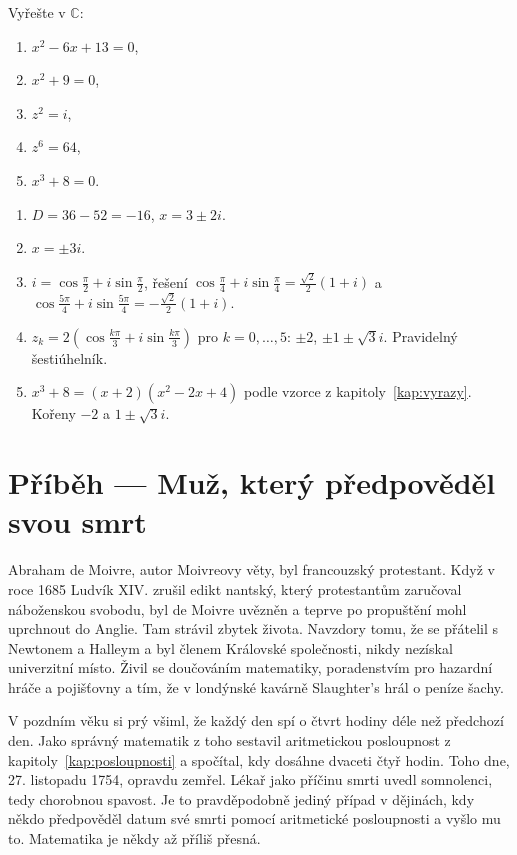 \begin{problem}
  Vyřešte v $\mathbb{C}$:
  \begin{enumerate}[label=(\alph*)]
    \item $x^2 - 6x + 13 = 0$,
    \item $x^2 + 9 = 0$,
    \item $z^2 = i$,
    \item $z^6 = 64$,
    \item $x^3 + 8 = 0$.
  \end{enumerate}
\end{problem}

\begin{solution}
  \begin{enumerate}[label=(\alph*)]
    \item $D = 36 - 52 = -16$, $x = 3\pm 2i$.
    \item $x = \pm 3i$.
    \item $i = \cos\frac{\pi}{2} + i\sin\frac{\pi}{2}$, řešení $\cos\frac{\pi}{4} + i\sin\frac{\pi}{4} = \frac{\sqrt{2}}{2}(1 + i)$ a $\cos\frac{5\pi}{4} + i\sin\frac{5\pi}{4} = -\frac{\sqrt{2}}{2}(1 + i)$.
    \item $z_k = 2\left(\cos\frac{k\pi}{3} + i\sin\frac{k\pi}{3}\right)$ pro $k = 0, \ldots, 5$: $\pm 2$, $\pm 1\pm\sqrt{3}i$. Pravidelný šestiúhelník.
    \item $x^3 + 8 = (x + 2)(x^2 - 2x + 4)$ podle vzorce z kapitoly~\ref{kap:vyrazy}. Kořeny $-2$ a $1\pm\sqrt{3}i$.
  \end{enumerate}
\end{solution}

\section{Příběh --- Muž, který předpověděl svou smrt}

Abraham de Moivre, autor Moivreovy věty, byl francouzský protestant. Když v roce 1685 Ludvík XIV. zrušil edikt nantský, který protestantům zaručoval náboženskou svobodu, byl de Moivre uvězněn a teprve po propuštění mohl uprchnout do Anglie. Tam strávil zbytek života. Navzdory tomu, že se přátelil s Newtonem a Halleym a byl členem Královské společnosti, nikdy nezískal univerzitní místo. Živil se doučováním matematiky, poradenstvím pro hazardní hráče a pojišťovny a tím, že v londýnské kavárně Slaughter's hrál o peníze šachy.

V pozdním věku si prý všiml, že každý den spí o čtvrt hodiny déle než předchozí den. Jako správný matematik z toho sestavil aritmetickou posloupnost z kapitoly~\ref{kap:posloupnosti} a spočítal, kdy dosáhne dvaceti čtyř hodin. Toho dne, 27. listopadu 1754, opravdu zemřel. Lékař jako příčinu smrti uvedl somnolenci, tedy chorobnou spavost. Je to pravděpodobně jediný případ v dějinách, kdy někdo předpověděl datum své smrti pomocí aritmetické posloupnosti a vyšlo mu to. Matematika je někdy až příliš přesná.

